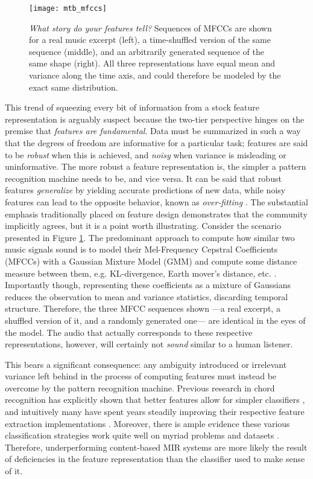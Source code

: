 \begin{figure}
\begin{centering}
\texttt{[image: mtb\_mfccs]}
\caption{\emph{What story do your features tell?} Sequences of MFCCs are shown for a real music excerpt (left), a time-shuffled version of the same sequence (middle), and an arbitrarily generated sequence of the same shape (right). All three representations have equal mean and variance along the time axis, and could therefore be modeled by the exact same distribution.}
\label{fig:mfccs}
\end{centering}
\end{figure}

This trend of squeezing every bit of information from a stock feature representation is arguably suspect because the two-tier perspective hinges on the premise that \emph{features are fundamental}. 
Data must be summarized in such a way that the degrees of freedom are informative for a particular task; features are said to be \emph{robust} when this is achieved, and \emph{noisy} when variance is misleading or uninformative.
The more robust a feature representation is, the simpler a pattern recognition machine needs to be, and vice versa.
It can be said that robust features \emph{generalize} by yielding accurate predictions of new data, while noisy features can lead to the opposite behavior, known as \emph{over-fitting} \cite{Bishop2006}.
The substantial emphasis traditionally placed on feature design demonstrates that the community implicitly agrees, but it is a point worth illustrating.
Consider the scenario presented in Figure \ref{fig:mfccs}.
The predominant approach to compute how similar two music signals sound is to model their Mel-Frequency Cepstral Coefficients (MFCCs) with a Gaussian Mixture Model (GMM) and compute some distance measure between them, e.g. KL-divergence, Earth mover's distance, etc. \cite{Berenzweig2004}.
Importantly though, representing these coefficients as a mixture of Gaussians reduces the observation to mean and variance statistics, discarding temporal structure.
Therefore, the three MFCC sequences shown ---a real excerpt, a shuffled version of it, and a randomly generated one--- are identical in the eyes of the model.
The audio that actually corresponds to these respective representations, however, will certainly not \emph{sound} similar to a human listener.

This bears a significant consequence: any ambiguity introduced or irrelevant variance left behind in the process of computing features must instead be overcome by the pattern recognition machine.
Previous research in chord recognition has explicitly shown that better features allow for simpler classifiers \cite{Cho2011}, and intuitively many have spent years steadily improving their respective feature extraction implementations \cite{Lyon2010,Mueller2011b}.
Moreover, there is ample evidence these various classification strategies work quite well on myriad problems and datasets \cite{Bishop2006}.
Therefore, underperforming content-based MIR systems are more likely the result of deficiencies in the feature representation than the classifier used to make sense of it. 


